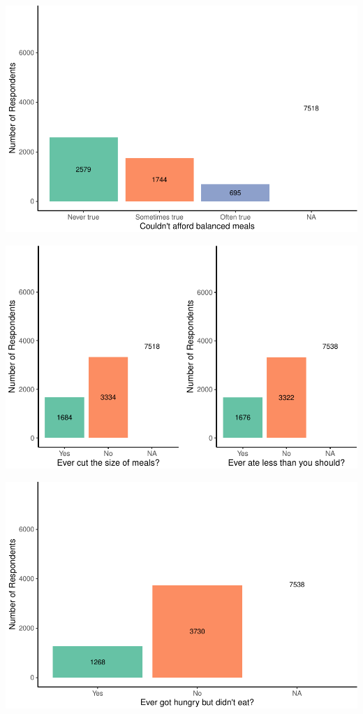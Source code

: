 \documentclass[
  10pt,
]{article}
\begin{document}
\includegraphics{phase1_report_files/figure-latex/unnamed-chunk-7-1}

\includegraphics{phase1_report_files/figure-latex/unnamed-chunk-8-1}

\includegraphics{phase1_report_files/figure-latex/unnamed-chunk-9-1}
\end{document}
